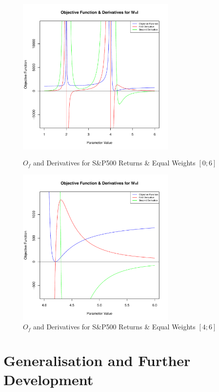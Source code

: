 \begin{figure}
    \centering
    \includegraphics[width=0.7\textwidth]{Derivatives.pdf}
    \caption{$O_f$ and Derivatives for S\&P500 Returns \& Equal Weights $[0;6]$}
    \label{Derivatives}
    \includegraphics[width=0.7\textwidth]{Derivatives_Zoom.pdf}
    \caption{$O_f$ and Derivatives for S\&P500 Returns \& Equal Weights $[4;6]$}
\end{figure}

\section{Generalisation and Further Development}

